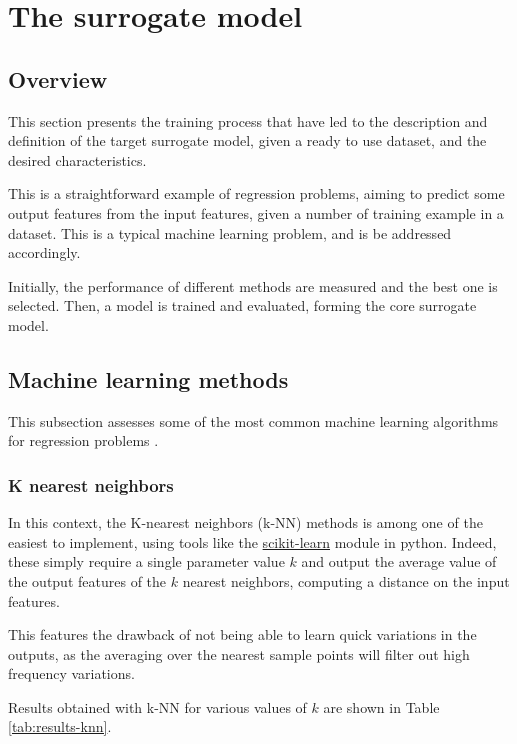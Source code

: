 \section{The surrogate model}

\subsection{Overview}

This section presents the training process that have led to the description and definition of the target surrogate model, given a ready to use dataset, and the desired characteristics.

This is a straightforward example of regression problems, aiming to predict some output features from the input features, given a number of training example in a dataset. This is a typical machine learning problem, and is be addressed accordingly.

Initially, the performance of different methods are measured and the best one is selected. Then, a model is trained and evaluated, forming the core surrogate model.

\subsection{Machine learning methods}

This subsection assesses some of the most common machine learning algorithms for regression problems \cite{machine-learning-class}.

\subsubsection{K nearest neighbors}

In this context, the K-nearest neighbors (k-NN) methods is among one of the easiest to implement, using tools like the \href{https://scikit-learn.org/stable/modules/neighbors.html\#nearest-neighbors-regression}{scikit-learn} \cite{scikit-learn} module in python. Indeed, these simply require a single parameter value $k$ and output the average value of the output features of the $k$ nearest neighbors, computing a distance on the input features.

This features the drawback of not being able to learn quick variations in the outputs, as the averaging over the nearest sample points will filter out high frequency variations.

Results obtained with k-NN for various values of $k$ are shown in Table \ref{tab:results-knn}.

